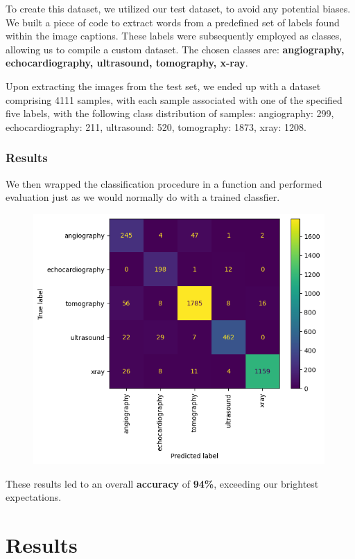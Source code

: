 \documentclass[12pt, a4paper]{article}
\begin{document}
To create this dataset, we utilized our test dataset, to avoid any potential biases. We built a piece of code to extract words from a predefined set of labels found within the image captions. These labels were subsequently employed as classes, allowing us to compile a custom dataset. The chosen classes are: \textbf{angiography, echocardiography, ultrasound, tomography, x-ray}.

Upon extracting the images from the test set, we ended up with a dataset comprising 4111 samples, with each sample associated with one of the specified five labels, with the following class distribution of samples: angiography: 299, echocardiography: 211, ultrasound: 520, tomography: 1873, xray: 1208.

\subsubsection{Results}
We then wrapped the classification procedure in a function and performed evaluation just as we would normally do with a trained classfier.

\begin{figure}[h]
    \includegraphics[width=30em]{img/Classification_Result.png}
    \centering
\end{figure}

These results led to an overall \textbf{accuracy} of \textbf{94\%}, exceeding our brightest expectations.

\section{Results}
\blindtext[1]
\end{document}
